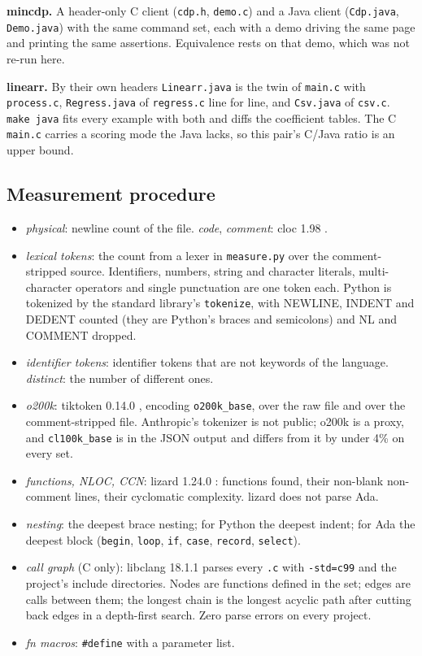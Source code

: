 \documentclass[11pt,a4paper]{article}
\begin{document}
\textbf{mincdp.} A header-only C client (\texttt{cdp.h}, \texttt{demo.c}) and a Java client (\texttt{Cdp.java}, \texttt{Demo.java}) with the same command set, each with a demo driving the same page and printing the same assertions. Equivalence rests on that demo, which was not re-run here.

\textbf{linearr.} By their own headers \texttt{Linearr.java} is the twin of \texttt{main.c} with \texttt{process.c}, \texttt{Regress.java} of \texttt{regress.c} line for line, and \texttt{Csv.java} of \texttt{csv.c}. \texttt{make java} fits every example with both and diffs the coefficient tables. The C \texttt{main.c} carries a scoring mode the Java lacks, so this pair's C/Java ratio is an upper bound.

\subsection{Measurement procedure}

\begin{itemize}[nosep]
\item \emph{physical}: newline count of the file. \emph{code}, \emph{comment}: cloc 1.98 \cite{cloc}.
\item \emph{lexical tokens}: the count from a lexer in \texttt{measure.py} over the comment-stripped source. Identifiers, numbers, string and character literals, multi-character operators and single punctuation are one token each. Python is tokenized by the standard library's \texttt{tokenize}, with NEWLINE, INDENT and DEDENT counted (they are Python's braces and semicolons) and NL and COMMENT dropped.
\item \emph{identifier tokens}: identifier tokens that are not keywords of the language. \emph{distinct}: the number of different ones.
\item \emph{o200k}: tiktoken 0.14.0 \cite{tiktoken}, encoding \texttt{o200k\_base}, over the raw file and over the comment-stripped file. Anthropic's tokenizer is not public; o200k is a proxy, and \texttt{cl100k\_base} is in the JSON output and differs from it by under 4\% on every set.
\item \emph{functions, NLOC, CCN}: lizard 1.24.0 \cite{lizard}: functions found, their non-blank non-comment lines, their cyclomatic complexity. lizard does not parse Ada.
\item \emph{nesting}: the deepest brace nesting; for Python the deepest indent; for Ada the deepest block (\texttt{begin}, \texttt{loop}, \texttt{if}, \texttt{case}, \texttt{record}, \texttt{select}).
\item \emph{call graph} (C only): libclang 18.1.1 parses every \texttt{.c} with \texttt{-std=c99} and the project's include directories. Nodes are functions defined in the set; edges are calls between them; the longest chain is the longest acyclic path after cutting back edges in a depth-first search. Zero parse errors on every project.
\item \emph{fn macros}: \texttt{\#define} with a parameter list.
\end{itemize}
\end{document}
